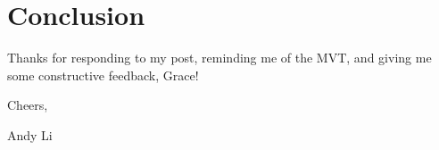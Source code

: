 \documentclass[letterpaper, 12pt]{article}
\begin{document}
\section{Conclusion}
Thanks for responding to my post, reminding me of the MVT, and giving me some constructive feedback, Grace!\bigskip \par
Cheers,\par
Andy Li
\end{document}
